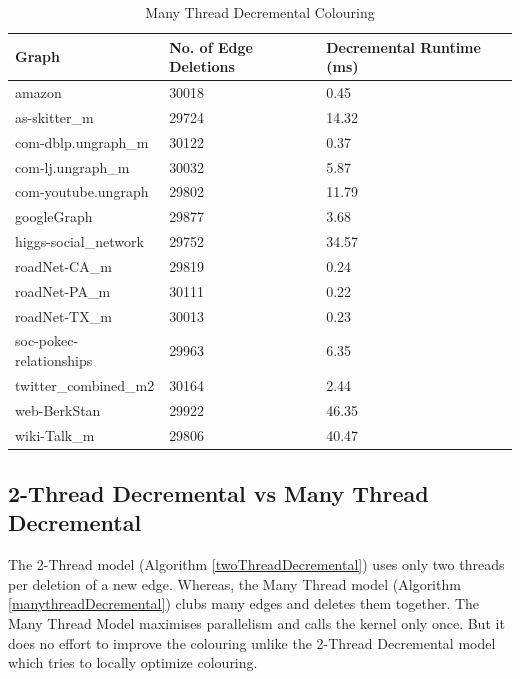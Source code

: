 \documentclass[MTech]{iitmdiss}
\begin{document}
\begin{table}[]
\centering
\begin{tabular}{|l|l|l|}
\hline
Graph                   & No. of Edge Deletions & Decremental Runtime (ms) \\ \hline
amazon                  & 30018                 & 0.45                     \\ \hline
as-skitter\_m           & 29724                 & 14.32                    \\ \hline
com-dblp.ungraph\_m     & 30122                 & 0.37                     \\ \hline
com-lj.ungraph\_m       & 30032                 & 5.87                     \\ \hline
com-youtube.ungraph     & 29802                 & 11.79                    \\ \hline
googleGraph             & 29877                 & 3.68                     \\ \hline
higgs-social\_network   & 29752                 & 34.57                    \\ \hline
roadNet-CA\_m           & 29819                 & 0.24                     \\ \hline
roadNet-PA\_m           & 30111                 & 0.22                     \\ \hline
roadNet-TX\_m           & 30013                 & 0.23                     \\ \hline
soc-pokec-relationships & 29963                 & 6.35                     \\ \hline
twitter\_combined\_m2   & 30164                 & 2.44                     \\ \hline
web-BerkStan            & 29922                 & 46.35                    \\ \hline
wiki-Talk\_m            & 29806                 & 40.47                    \\ \hline
\end{tabular}
\caption{Many Thread Decremental Colouring}
\label{manyDec}
\end{table}

\subsection{2-Thread Decremental vs Many Thread Decremental}
The 2-Thread model (Algorithm \ref{twoThreadDecremental}) uses only two threads per deletion of a new edge. Whereas, the Many Thread model (Algorithm \ref{manythreadDecremental}) clubs many edges and deletes them together. The Many Thread Model maximises parallelism and calls the kernel only once. But it does no effort to improve the colouring unlike the 2-Thread Decremental model which tries to locally optimize colouring.
\end{document}
